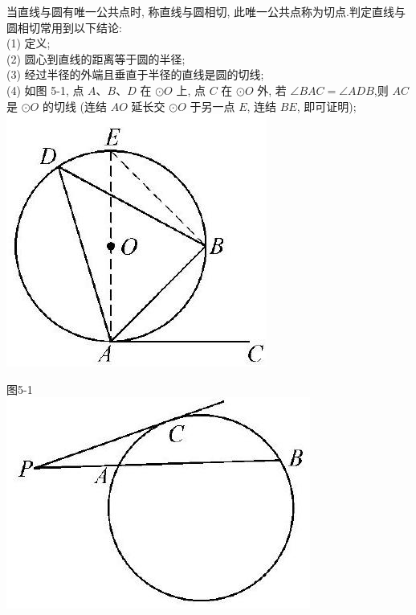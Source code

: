 \documentclass[10pt]{article}
\begin{document}
当直线与圆有唯一公共点时, 称直线与圆相切, 此唯一公共点称为切点.判定直线与圆相切常用到以下结论:\\
(1) 定义;\\
(2) 圆心到直线的距离等于圆的半径;\\
(3) 经过半径的外端且垂直于半径的直线是圆的切线;\\
(4) 如图 5-1, 点 $A 、 B 、 D$ 在 $\odot O$ 上, 点 $C$ 在 $\odot O$ 外, 若 $\angle B A C=\angle A D B$,则 $A C$ 是 $\odot O$ 的切线 (连结 $A O$ 延长交 $\odot O$ 于另一点 $E$, 连结 $B E$, 即可证明);\\
\includegraphics[max width=\textwidth, center]{2024_10_30_66b8e5e701da2093c133g-034(1)}

图5-1\\
\includegraphics[max width=\textwidth, center]{2024_10_30_66b8e5e701da2093c133g-034}
\end{document}
